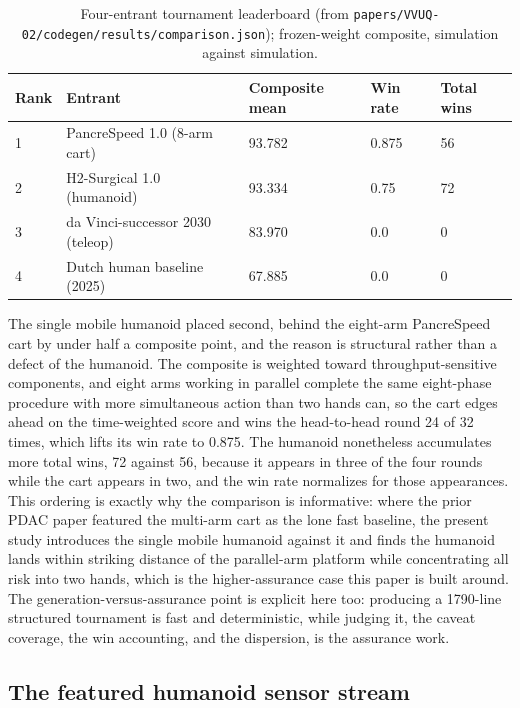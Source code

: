 \begin{table}[H]
\caption{Four-entrant tournament leaderboard (from
\texttt{papers/VVUQ-02/codegen/results/comparison.json}); frozen-weight composite,
simulation against simulation.}
\label{tab:leaderboard}
\centering
\footnotesize
\begin{tabularx}{\textwidth}{L{0.9cm} Y L{2.3cm} L{1.5cm} L{1.7cm}}
\toprule
\textbf{Rank} & \textbf{Entrant} & \textbf{Composite mean} & \textbf{Win rate} & \textbf{Total wins} \\
 & PancreSpeed 1.0 (8-arm cart) & 93.782 & 0.875 & 56 \\
2 & H2-Surgical 1.0 (humanoid) & 93.334 & 0.75 & 72 \\
3 & da Vinci-successor 2030 (teleop) & 83.970 & 0.0 & 0 \\
4 & Dutch human baseline (2025) & 67.885 & 0.0 & 0 \\
\bottomrule
\end{tabularx}
\end{table}

The single mobile humanoid placed second, behind the eight-arm PancreSpeed cart
by under half a composite point, and the reason is structural rather than a defect
of the humanoid. The composite is weighted toward throughput-sensitive
components, and eight arms working in parallel complete the same eight-phase
procedure with more simultaneous action than two hands can, so the cart edges
ahead on the time-weighted score and wins the head-to-head round 24 of 32 times,
which lifts its win rate to 0.875. The humanoid nonetheless accumulates more total
wins, 72 against 56, because it appears in three of the four rounds while the cart
appears in two, and the win rate normalizes for those appearances. This ordering
is exactly why the comparison is informative: where the prior PDAC paper featured
the multi-arm cart as the lone fast baseline, the present study introduces the
single mobile humanoid against it and finds the humanoid lands within striking
distance of the parallel-arm platform while concentrating all risk into two hands,
which is the higher-assurance case this paper is built around. The
generation-versus-assurance point is explicit here too: producing a 1790-line
structured tournament is fast and deterministic, while judging it, the caveat
coverage, the win accounting, and the dispersion, is the assurance work.

\subsection{The featured humanoid sensor stream}

